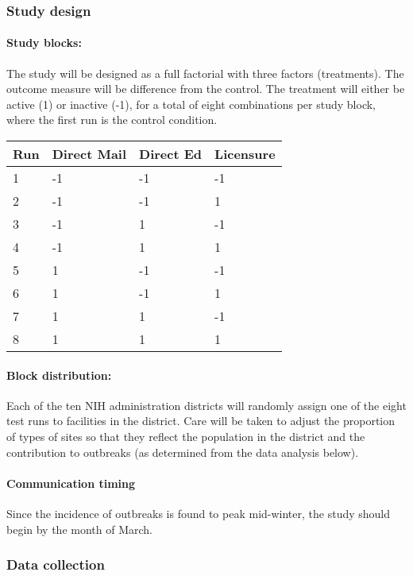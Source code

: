 \documentclass[11pt]{article}
\begin{document}
    \hypertarget{study-design}{%
\subsubsection{Study design}\label{study-design}}

\hypertarget{study-blocks}{%
\paragraph{Study blocks:}\label{study-blocks}}

The study will be designed as a full factorial with three factors
(treatments). The outcome measure will be difference from the control.
The treatment will either be active (1) or inactive (-1), for a total of
eight combinations per study block, where the first run is the control
condition.

\begin{longtable}[]{@{}llll@{}}
\toprule
Run & Direct Mail & Direct Ed & Licensure\tabularnewline
\midrule
\endhead
1 & -1 & -1 & -1\tabularnewline
2 & -1 & -1 & 1\tabularnewline
3 & -1 & 1 & -1\tabularnewline
4 & -1 & 1 & 1\tabularnewline
5 & 1 & -1 & -1\tabularnewline
6 & 1 & -1 & 1\tabularnewline
7 & 1 & 1 & -1\tabularnewline
8 & 1 & 1 & 1\tabularnewline
\bottomrule
\end{longtable}

\hypertarget{block-distribution}{%
\paragraph{Block distribution:}\label{block-distribution}}

Each of the ten NIH administration districts will randomly assign one of
the eight test runs to facilities in the district. Care will be taken to
adjust the proportion of types of sites so that they reflect the
population in the district and the contribution to outbreaks (as
determined from the data analysis below).

    \hypertarget{communication-timing}{%
\paragraph{Communication timing}\label{communication-timing}}

Since the incidence of outbreaks is found to peak mid-winter, the study
should begin by the month of March.

    \hypertarget{data-collection}{%
\subsubsection{Data collection}\label{data-collection}}
\end{document}
